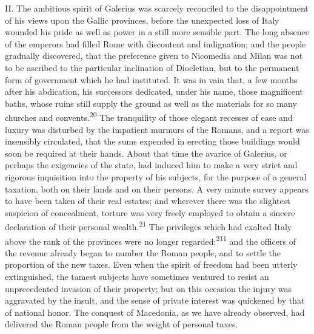 

II. The ambitious spirit of Galerius was scarcely reconciled to
the disappointment of his views upon the Gallic provinces, before
the unexpected loss of Italy wounded his pride as well as power
in a still more sensible part. The long absence of the emperors
had filled Rome with discontent and indignation; and the people
gradually discovered, that the preference given to Nicomedia and
Milan was not to be ascribed to the particular inclination of
Diocletian, but to the permanent form of government which he had
instituted. It was in vain that, a few months after his
abdication, his successors dedicated, under his name, those
magnificent baths, whose ruins still supply the ground as well as
the materials for so many churches and convents.\textsuperscript{20} The
tranquility of those elegant recesses of ease and luxury was
disturbed by the impatient murmurs of the Romans, and a report
was insensibly circulated, that the sums expended in erecting
those buildings would soon be required at their hands. About that
time the avarice of Galerius, or perhaps the exigencies of the
state, had induced him to make a very strict and rigorous
inquisition into the property of his subjects, for the purpose of
a general taxation, both on their lands and on their persons. A
very minute survey appears to have been taken of their real
estates; and wherever there was the slightest suspicion of
concealment, torture was very freely employed to obtain a sincere
declaration of their personal wealth.\textsuperscript{21} The privileges which had
exalted Italy above the rank of the provinces were no longer
regarded:\textsuperscript{211} and the officers of the revenue already began to
number the Roman people, and to settle the proportion of the new
taxes. Even when the spirit of freedom had been utterly
extinguished, the tamest subjects have sometimes ventured to
resist an unprecedented invasion of their property; but on this
occasion the injury was aggravated by the insult, and the sense
of private interest was quickened by that of national honor. The
conquest of Macedonia, as we have already observed, had delivered
the Roman people from the weight of personal taxes.

